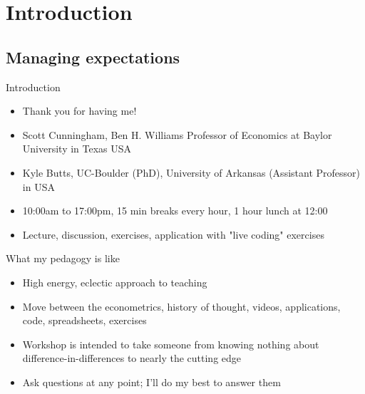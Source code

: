 \documentclass{beamer}
\begin{document}



\section{Introduction}

\subsection{Managing expectations}


\begin{frame}{Introduction}

\begin{itemize}
\item Thank you for having me!  
\item Scott Cunningham, Ben H. Williams Professor of Economics at Baylor University in Texas USA
\item Kyle Butts, UC-Boulder (PhD), University of Arkansas (Assistant Professor) in USA
\item 10:00am to 17:00pm, 15 min breaks every hour, 1 hour lunch at 12:00
\item Lecture, discussion, exercises, application with "live coding" exercises
\end{itemize}

\end{frame}


\begin{frame}{What my pedagogy is like}

\begin{itemize}
\item High energy, eclectic approach to teaching
\item Move between the econometrics, history of thought, videos, applications, code, spreadsheets, exercises
\item Workshop is intended to take someone from knowing nothing about difference-in-differences to nearly the cutting edge
\item Ask questions at any point; I'll do my best to answer them
\end{itemize}

\end{frame}
\end{document}
